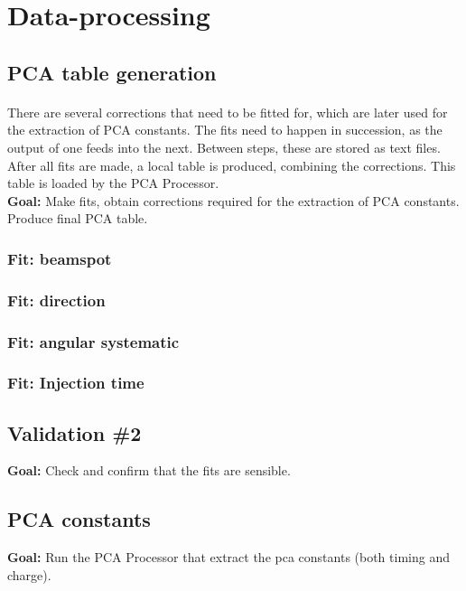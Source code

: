 \documentclass[12pt]{article}
\begin{document}

\section{Data-processing}
\subsection{PCA table generation}
\paragraph{}
There are several corrections that need to be fitted for, which are later used for the extraction of PCA constants. The fits need to happen in succession, as the output of one feeds into the next. Between steps, these are stored as text files. After all fits are made, a local table is produced, combining the corrections. This table is loaded by the PCA Processor.\\
\textbf{Goal:} Make fits, obtain corrections required for the extraction of PCA constants. Produce final PCA table.

\subsubsection{Fit: beamspot}

\subsubsection{Fit: direction}

\subsubsection{Fit: angular systematic}

\subsubsection{Fit: Injection time}

\subsection{Validation \#2}
\textbf{Goal:} Check and confirm that the fits are sensible.


\subsection{PCA constants}
\textbf{Goal:} Run the PCA Processor that extract the pca constants (both timing and charge).
\end{document}
